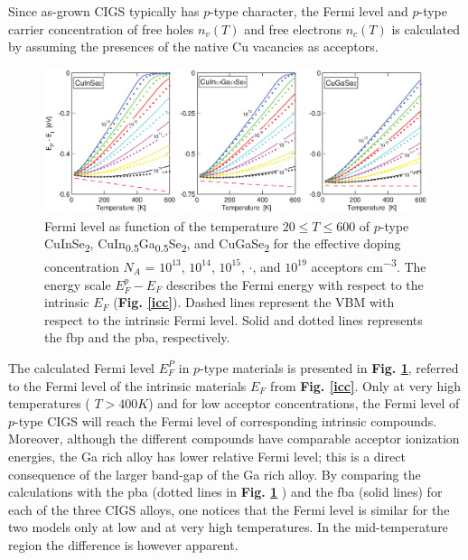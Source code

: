 \documentclass[a4paper, 12pt, titlepage,oneside,drop]{kthesis}
\begin{document}
Since as-grown CIGS typically has $p$-type character, the Fermi level and $p$-type carrier concentration of free holes $n_v(T)$ and free electrons $n_c(T)$ is calculated by 
assuming the presences of the native Cu vacancies as acceptors. 

 \begin{figure}[H]
    \begin{center}
            \includegraphics[width=1\textwidth,clip]{paper2fig8}
     \end{center}
    \caption{Fermi level as function of the temperature $20 \leq T \leq 600$ of $p$-type CuInSe\textsubscript{2}, CuIn\textsubscript{0.5}Ga\textsubscript{0.5}Se\textsubscript{2}, and CuGaSe\textsubscript{2} for the effective
    doping concentration $N_A$ = $10^{13}$, $10^{14}$, $10^{15}$, $\cdot$, and $10^{19}$ acceptors cm\textsuperscript{$-$3}. The energy scale $E_F^p-E_F$ describes the Fermi energy with respect to the intrinsic $E_F$ (\textbf{Fig. \ref{icc}}).
    Dashed lines represent the VBM with respect to the intrinsic Fermi level. Solid and dotted lines represents the fbp and the pba, respectively.}
   \label{ptypecc1}
\end{figure}




The calculated Fermi level $E_F^P$ in $p$-type materials is presented in \textbf{Fig. \ref{ptypecc1}}, referred to the Fermi level of the intrinsic materials $E_F$ from \textbf{Fig. \ref{icc}}. Only at very high temperatures
( $T > 400 K$) and for low acceptor concentrations, the Fermi level of $p$-type CIGS will reach the Fermi level of corresponding intrinsic compounds. Moreover, although the different compounds have comparable acceptor ionization
energies, the Ga rich alloy has lower relative Fermi level; this is a direct consequence of the larger band-gap of the Ga rich alloy. By comparing the calculations with the pba (dotted lines in \textbf{Fig. \ref{ptypecc1}} ) and 
the fba (solid lines) for each of the three CIGS alloys, one notices that the Fermi level is similar for the two models only at low and at very high temperatures. In the mid-temperature region the difference is however apparent.
\end{document}
